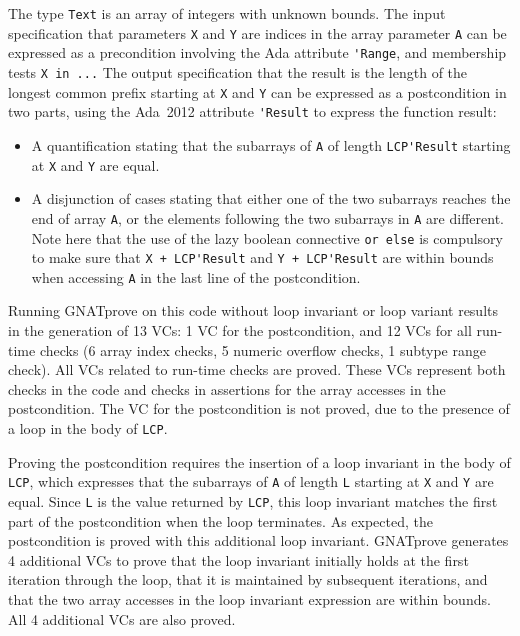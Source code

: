 \documentclass[sttt,draft]{svjour}
\newcommand{\gnatprove}{GNATprove\xspace}
\newcommand{\adatwtw}{Ada~2012\xspace}
\begin{document}
The type \verb|Text| is an array of integers with unknown bounds. The input
specification that parameters \verb|X| and \verb|Y| are indices in the array
parameter \verb|A| can be expressed as a precondition involving the Ada
attribute \verb|'Range|, and membership tests \verb|X in ...| The output
specification that the result is the length of the longest common prefix
starting at \verb|X| and \verb|Y| can be expressed as a postcondition in two
parts, using the \adatwtw attribute \verb|'Result| to express the function
result:
\begin{itemize}
\item A quantification stating that the subarrays of \verb|A| of length
  \verb|LCP'Result| starting at \verb|X| and \verb|Y| are equal.
\item A disjunction of cases stating that either one of the two subarrays
  reaches the end of array \verb|A|, or the elements following the two
  subarrays in \verb|A| are different. Note here that the use of the lazy
  boolean connective \verb|or else| is compulsory to make sure that
  \verb|X + LCP'Result| and \verb|Y + LCP'Result| are within bounds when
  accessing \verb|A| in the last line of the postcondition.
\end{itemize}

Running \gnatprove on this code without loop invariant or loop variant results
in the generation of 13 VCs: 1 VC for the postcondition, and 12 VCs for all
run-time checks (6 array index checks, 5 numeric overflow checks, 1 subtype
range check). All VCs related to run-time checks are proved. These VCs
represent both checks in the code and checks in assertions for the array
accesses in the postcondition. The VC for the postcondition is not proved, due
to the presence of a loop in the body of \verb|LCP|.

Proving the postcondition requires the insertion of a loop invariant in the
body of \verb|LCP|, which expresses that the subarrays of \verb|A| of length
\verb|L| starting at \verb|X| and \verb|Y| are equal. Since \verb|L| is the
value returned by \verb|LCP|, this loop invariant matches the first part of the
postcondition when the loop terminates. As expected, the postcondition is
proved with this additional loop invariant. \gnatprove generates 4 additional
VCs to prove that the loop invariant initially holds at the first iteration
through the loop, that it is maintained by subsequent iterations, and that the
two array accesses in the loop invariant expression are within bounds. All 4
additional VCs are also proved.
\end{document}
